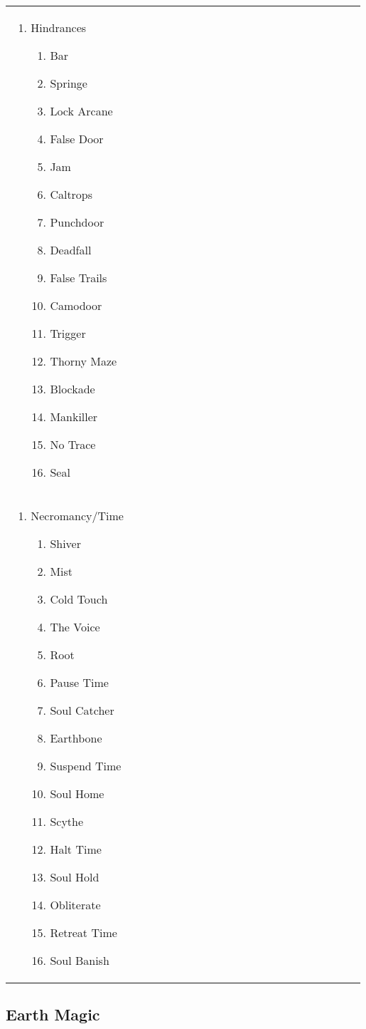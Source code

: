 \begin{tabular}{@{} p{0.33\linewidth} p{0.33\linewidth} p{0.33\linewidth}}
\begin{enumerate}
	\item Hindrances
	\begin{enumerate}
		\item Bar
		\item Springe
		\item Lock Arcane
		\item False Door
		\item Jam
		\item Caltrops
		\item Punchdoor
		\item Deadfall
		\item False Trails
		\item Camodoor
		\item Trigger
		\item Thorny Maze
		\item Blockade
		\item Mankiller
		\item No Trace
		\item Seal
	\end{enumerate}
\end{enumerate} \\
\begin{enumerate}
	\item Necromancy/Time
	\begin{enumerate}
		\item Shiver
		\item Mist
		\item Cold Touch
		\item The Voice
		\item Root
		\item Pause Time
		\item Soul Catcher
		\item Earthbone
		\item Suspend Time
		\item Soul Home
		\item Scythe
		\item Halt Time
		\item Soul Hold
		\item Obliterate
		\item Retreat Time
		\item Soul Banish
	\end{enumerate}
\end{enumerate} &
\end{tabular}

\subsection{Earth Magic}

